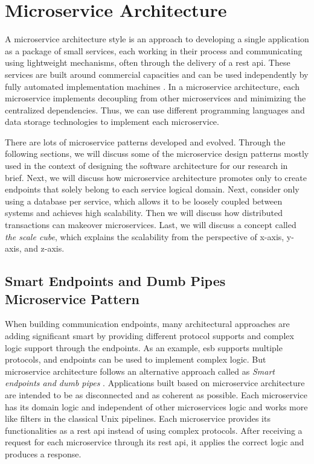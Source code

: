 \section{Microservice Architecture}
\label{se:microservice}

A microservice architecture style is an approach to developing a single application as a package of small services, each working in their process and communicating using lightweight mechanisms, often through the delivery of a \acrfull{rest} \acrshort{api}. These services are built around commercial capacities and can be used independently by fully automated implementation machines \cite{LewisMicroservices}. In a microservice architecture, each microservice implements decoupling from other microservices and minimizing the centralized dependencies. Thus, we can use different programming languages and data storage technologies to implement each microservice.

There are lots of microservice patterns developed and evolved. Through the following sections, we will discuss some of the microservice design patterns mostly used in the context of designing the software architecture for our research in brief. Next, we will discuss how microservice architecture promotes only to create endpoints that solely belong to each service logical domain. Next, consider only using a database per service, which allows it to be loosely coupled between systems and achieves high scalability. Then we will discuss how distributed transactions can makeover microservices. Last, we will discuss a concept called \emph{the scale cube}, which explains the scalability from the perspective of x-axis, y-axis, and z-axis.


\subsection{Smart Endpoints and Dumb Pipes  Microservice Pattern}
\label{subse:dumb_pipes}

When building communication endpoints, many architectural approaches are adding significant smart by providing different protocol supports and complex logic support through the endpoints. As an example, \acrshort{esb} supports multiple protocols, and endpoints can be used to implement complex logic. But microservice architecture follows an alternative approach called as \emph{Smart endpoints and dumb pipes} \cite{LewisMicroservicesPipes}. Applications built based on microservice architecture are intended to be as disconnected and as coherent as possible. Each microservice has its domain logic and independent of other microservices logic and works more like filters in the classical Unix pipelines. Each microservice provides its functionalities as a \acrshort{rest} \acrshort{api} instead of using complex protocols. After receiving a request for each microservice through its \acrshort{rest} \acrshort{api}, it applies the correct logic and produces a response.

